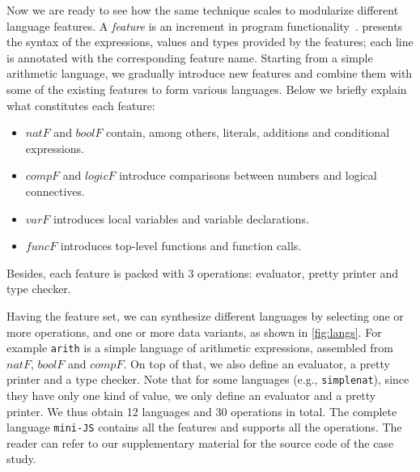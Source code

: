 Now we are ready to see how the same technique scales to modularize different
language features. A \emph{feature} is an increment in program
functionality~\cite{zave1999faq,lopez2005evaluating}. 
presents the syntax of the expressions, values and types provided by the
features; each line is annotated with the corresponding feature name. Starting from a
simple arithmetic language, we gradually introduce new features and combine them
with some of the existing features to form various languages. Below we briefly
explain what constitutes each feature:
\begin{itemize}
\item $\mathit{natF}$ and $\mathit{boolF}$ contain, among others, literals, additions and conditional expressions.
\item $\mathit{compF}$ and $\mathit{logicF}$ introduce comparisons between numbers and logical connectives.
\item $\mathit{varF}$ introduces local variables and variable declarations.
\item $\mathit{funcF}$ introduces top-level functions and function calls.
\end{itemize}
Besides, each feature is packed with 3 operations: evaluator, pretty
printer and type checker.

Having the feature set, we can synthesize different languages by selecting one
or more operations, and one or more data variants, as shown in \cref{fig:langs}.
For example \lstinline{arith} is a simple language of arithmetic expressions,
assembled from $\mathit{natF}$, $\mathit{boolF}$ and $\mathit{compF}$. On top of
that, we also define an evaluator, a pretty printer and a type checker. Note
that for some languages (e.g., \lstinline{simplenat}), since they have only one
kind of value, we only define an evaluator and a pretty printer. We thus obtain
12 languages and 30 operations in total. The complete language
\lstinline{mini-JS} contains all the features and supports all the operations. %
The reader can refer to our supplementary material for the source code of the case study.


